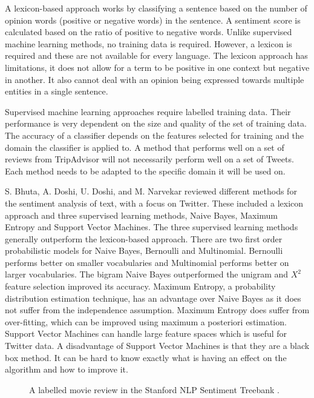 A lexicon-based approach works by classifying a sentence based on the number of opinion words (positive or negative words) in the sentence. A sentiment score is calculated based on the ratio of positive to negative words. Unlike supervised machine learning methods, no training data is required. However, a lexicon is required and these are not available for every language. The lexicon approach has limitations, it does not allow for a term to be positive in one context but negative in another. It also cannot deal with an opinion being expressed towards multiple entities in a single sentence.

Supervised machine learning approaches require labelled training data. Their performance is very dependent on the size and quality of the set of training data. The accuracy of a classifier depends on the features selected for training and the domain the classifier is applied to. A method that performs well on a set of reviews from TripAdvisor will not necessarily perform well on a set of Tweets. Each method needs to be adapted to the specific domain it will be used on.

S. Bhuta, A. Doshi, U. Doshi, and M. Narvekar \cite{Bhuta2014} reviewed different methods for the sentiment analysis of text, with a focus on Twitter. These included a lexicon approach and three supervised learning methods, Naive Bayes, Maximum Entropy and Support Vector Machines. The three supervised learning methods generally outperform the lexicon-based approach. There are two first order probabilistic models for Naive Bayes, Bernoulli and Multinomial. Bernoulli performs better on smaller vocabularies and Multinomial performs better on larger vocabularies. The bigram Naive Bayes outperformed the unigram and ${X}^2$ feature selection improved its accuracy. Maximum Entropy, a probability distribution estimation technique, has an advantage over Naive Bayes as it does not suffer from the independence assumption. Maximum Entropy does suffer from over-fitting, which can be improved using maximum a posteriori estimation. Support Vector Machines can handle large feature spaces which is useful for Twitter data. A disadvantage of Support Vector Machines is that they are a black box method. It can be hard to know exactly what is having an effect on the algorithm and how to improve it.

\begin{figure}[h!]
\centering
{}
\caption{\label{fig:treebank} A labelled movie review in the Stanford NLP Sentiment Treebank \cite{stanfordSentiment2013}.}
\end{figure}

